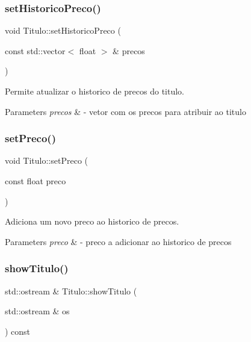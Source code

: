 \mbox{\label{class_titulo_a8ea091928732a5ff5b974e003668a778}} 
\subsubsection{\texorpdfstring{set\+Historico\+Preco()}{setHistoricoPreco()}}
{\footnotesize\ttfamily void Titulo\+::set\+Historico\+Preco (\begin{DoxyParamCaption}\item[{const std\+::vector$<$ float $>$ \&}]{precos }\end{DoxyParamCaption})}



Permite atualizar o historico de precos do titulo. 


\begin{DoxyParams}{Parameters}
{\em precos} & -\/ vetor com os precos para atribuir ao titulo \\
\hline
\end{DoxyParams}
\mbox{\label{class_titulo_a08d0b556bebf6863edb62ed5dc19923c}} 
\subsubsection{\texorpdfstring{set\+Preco()}{setPreco()}}
{\footnotesize\ttfamily void Titulo\+::set\+Preco (\begin{DoxyParamCaption}\item[{const float}]{preco }\end{DoxyParamCaption})}



Adiciona um novo preco ao historico de precos. 


\begin{DoxyParams}{Parameters}
{\em preco} & -\/ preco a adicionar ao historico de precos \\
\hline
\end{DoxyParams}
\mbox{\label{class_titulo_ab31e1d801062a75abdb10664de23d897}} 
\subsubsection{\texorpdfstring{show\+Titulo()}{showTitulo()}}
{\footnotesize\ttfamily std\+::ostream \& Titulo\+::show\+Titulo (\begin{DoxyParamCaption}\item[{std\+::ostream \&}]{os }\end{DoxyParamCaption}) const}



